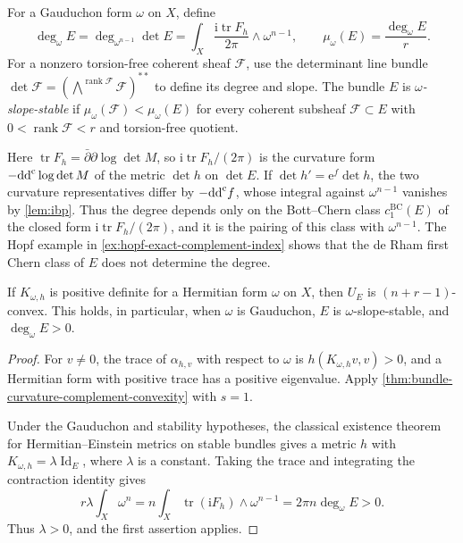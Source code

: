 \begin{definition}\label{def:gauduchon-bundle-slope}
For a Gauduchon form $\omega$ on $X$, define
\[
 \deg_\omega E=\deg_{\omega^{n-1}}\det E
 =\int_X\frac{\mathrm i\operatorname{tr}F_h}{2\pi}\wedge\omega^{n-1},
 \qquad \mu_\omega(E)=\frac{\deg_\omega E}{r}.
\]
For a nonzero torsion-free coherent sheaf $\mathcal F$, use the determinant line bundle $\det\mathcal F=(\bigwedge^{\operatorname{rank}\mathcal F}\mathcal F)^{**}$ to define its degree and slope. The bundle $E$ is \emph{$\omega$-slope-stable} if $\mu_\omega(\mathcal F)<\mu_\omega(E)$ for every coherent subsheaf $\mathcal F\subset E$ with $0<\operatorname{rank}\mathcal F<r$ and torsion-free quotient.
\end{definition}

Here $\operatorname{tr}F_h=\bar\partial\partial\log\det M$, so $\mathrm i\operatorname{tr}F_h/(2\pi)$ is the curvature form $-\mathrm{dd}^{\mathrm{c}}\log\det M$ of the metric $\det h$ on $\det E$. If $\det h'=\mathrm e^f\det h$, the two curvature representatives differ by $-\mathrm{dd}^{\mathrm{c}} f$, whose integral against $\omega^{n-1}$ vanishes by \cref{lem:ibp}. Thus the degree depends only on the Bott--Chern class $c_1^{\mathrm{BC}}(E)$ of the closed form $\mathrm i\operatorname{tr}F_h/(2\pi)$, and it is the pairing of this class with $\omega^{n-1}$. The Hopf example in \cref{ex:hopf-exact-complement-index} shows that the de Rham first Chern class of $E$ does not determine the degree.

\begin{corollary}\label{cor:positive-mean-complement-convexity}
If $K_{\omega,h}$ is positive definite for a Hermitian form $\omega$ on $X$, then $U_E$ is $(n+r-1)$-convex. This holds, in particular, when $\omega$ is Gauduchon, $E$ is $\omega$-slope-stable, and $\deg_\omega E>0$.
\end{corollary}
\begin{proof}
For $v\ne0$, the trace of $\alpha_{h,v}$ with respect to $\omega$ is $h(K_{\omega,h}v,v)>0$, and a Hermitian form with positive trace has a positive eigenvalue. Apply \cref{thm:bundle-curvature-complement-convexity} with $s=1$.

Under the Gauduchon and stability hypotheses, the classical existence theorem for Hermitian--Einstein metrics on stable bundles gives a metric $h$ with $K_{\omega,h}=\lambda\operatorname{Id}_E$, where $\lambda$ is a constant. Taking the trace and integrating the contraction identity gives
\[
 r\lambda\int_X\omega^n
 =n\int_X\operatorname{tr}(\mathrm iF_h)\wedge\omega^{n-1}
 =2\pi n\deg_\omega E>0.
\]
Thus $\lambda>0$, and the first assertion applies.
\end{proof}

